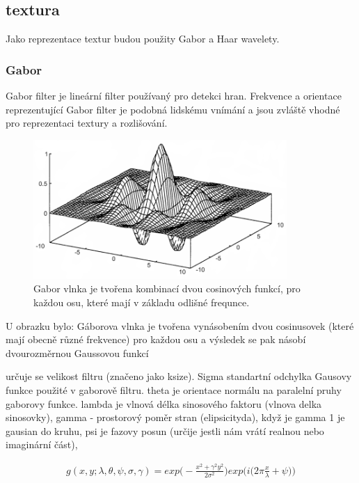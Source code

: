 \documentclass[czech,BP]{thesiskiv}
\begin{document}
\subsection{textura}
Jako reprezentace textur budou použity Gabor a Haar wavelety. 

\subsubsection{Gabor}
Gabor filter je lineární filter používaný pro detekci hran. Frekvence a orientace reprezentující Gabor filter je podobná lidskému vnímání a jsou zvláště vhodné pro reprezentaci textury a rozlišování. 

\begin{figure}[ht]
		\centering
		\includegraphics[height=200px]{./img/gabor.png}
		\caption{Gabor vlnka je tvořena kombinací dvou cosinových funkcí, pro každou osu, které mají v základu odlišné frequnce.\cite{Gabor}} 					
\end{figure}

U obrazku bylo: 
Gáborova vlnka je tvořena vynásobením dvou cosinusovek (které mají obecně různé
frekvence) pro každou osu a výsledek se pak násobí dvourozměrnou Gaussovou funkcí

určuje se velikost filtru (značeno jako ksize). Sigma standartní odchylka Gausovy funkce použité v gaborově filtru. theta je orientace normálu na paralelní pruhy gaborovy funkce. lambda je vlnová délka sinosového faktoru (vlnova delka sinosovky), gamma - prostorový poměr stran (elipsicityda), když je gamma 1 je gausian do kruhu, psi je fazovy posun (určije jestli nám vrátí realnou nebo imaginární část), 


\begin{align}
   \label{gabor_complex}  g(x, y; \lambda, \theta, \psi, \sigma,  \gamma) = exp \Bigg( - \frac{{x^2 + \gamma^2 y^2}}{2 \sigma^2} \Bigg) exp \Bigg(i \bigg(2\pi \frac{x}{\lambda} + \psi \bigg)\Bigg)  
\end{align}
\end{document}
